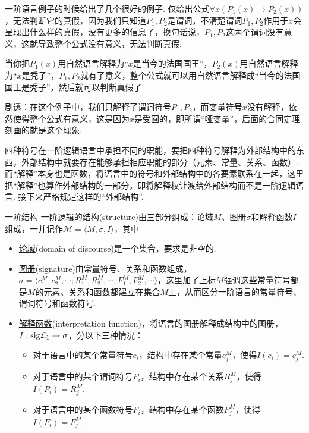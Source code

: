 \documentclass[main.tex]{subfiles}
\begin{document}
\begin{note}
    一阶语言例子的时候给出了几个很好的例子. 仅给出公式\(\forall x (P_1(x) \to P_2(x))\)，无法判断它的真假，因为我们只知道\(P_1,P_2\)是谓词，不清楚谓词\(P_1,P_2\)作用于\(x\)会呈现出什么样的真假，没有更多的信息了，换句话说，\(P_1,P_2\)这两个谓词没有意义，这就导致整个公式没有意义，无法判断真假. 

    当你把\(P_1(x)\)用自然语言解释为“\(x\)是当今的法国国王”，\(P_2(x)\)用自然语言解释为“\(x\)是秃子”，\(P_1,P_2\)就有了意义，整个公式就可以用自然语言解释成“当今的法国国王是秃子”，然后就可以判断真假了. 

    剧透：在这个例子中，我们只解释了谓词符号\(P_1, P_2\)，而变量符号\(x\)没有解释，依然使得整个公式有意义，这是因为\(x\)是受囿的，即所谓“哑变量”，后面的合同定理刻画的就是这个现象.
\end{note}

四种符号在一阶逻辑语言中承担不同的职能，要把四种符号解释为外部结构中的东西，外部结构中就要存在能够承担相应职能的部分（元素、常量、关系、函数）. 而“解释”本身也是函数，将语言中的符号和外部结构中的各要素联系在一起，这里把“解释”也算作外部结构的一部分，即将解释权让渡给外部结构而不是一阶逻辑语言. 接下来严格规定这样的“外部结构”.

\begin{definition}{一阶结构}
    一阶逻辑的\uline{结构}(structure)由三部分组成：论域\(M\)、图册\(\sigma\)和解释函数\(I\)组成，一并记作\(\mathcal{M} = \langle M, \sigma, I \rangle\)，其中
    \begin{itemize}
        \item \uline{论域}(domain of discourse)是一个集合，要求是非空的.
        \item \uline{图册}(signature)由常量符号、关系和函数组成，\(\sigma = \langle c_1^M, c_2^M, \cdots; R_1^M, R_2^M, \cdots; F_1^M, F_2^M, \cdots \rangle\)，这里加了上标\(M\)强调这些常量符号都是\(M\)的元素、关系和函数都建立在集合\(M\)上，从而区分一阶语言的常量符号、谓词符号和函数符号.
        \item \uline{解释函数}(interpretation function)，将语言的图册解释成结构中的图册，\(I: {\rm sig}\mathcal{L}_1 \to \sigma\)，分以下三种情况：
        \begin{itemize}
            \item 对于语言中的某个常量符号\(c_i\)，结构中存在某个常量\(c_j^M\)，使得\(I(c_i) = c_j^M\).
            \item 对于语言中的某个谓词符号\(P_i\)，结构中存在某个关系\(R_j^M\)，使得\(I(P_i) = R_j^M\).
            \item 对于语言中的某个函数符号\(F_i\)，结构中存在某个函数\(F_j^M\)，使得\(I(F_i) = F_j^M\).
        \end{itemize}
    \end{itemize}
\end{definition}
\end{document}
